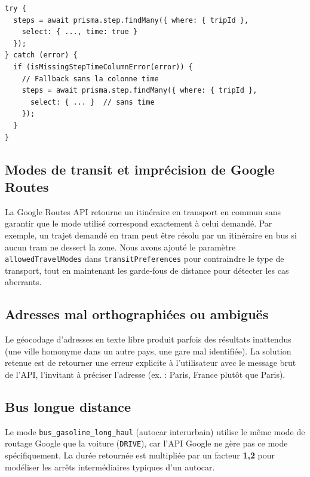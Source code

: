 \documentclass[11pt,a4paper]{article}
\begin{document}
\begin{lstlisting}[caption={Détection et contournement de la colonne manquante}]
try {
  steps = await prisma.step.findMany({ where: { tripId },
    select: { ..., time: true }
  });
} catch (error) {
  if (isMissingStepTimeColumnError(error)) {
    // Fallback sans la colonne time
    steps = await prisma.step.findMany({ where: { tripId },
      select: { ... }  // sans time
    });
  }
}
\end{lstlisting}

\subsection{Modes de transit et imprécision de Google Routes}

La Google Routes API retourne un itinéraire en transport en commun sans garantir que le mode utilisé correspond exactement à celui demandé. Par exemple, un trajet demandé en \og tram \fg{} peut être résolu par un itinéraire en bus si aucun tram ne dessert la zone. Nous avons ajouté le paramètre \texttt{allowedTravelModes} dans \texttt{transitPreferences} pour contraindre le type de transport, tout en maintenant les garde-fous de distance pour détecter les cas aberrants.

\subsection{Adresses mal orthographiées ou ambiguës}

Le géocodage d'adresses en texte libre produit parfois des résultats inattendus (une ville homonyme dans un autre pays, une gare mal identifiée). La solution retenue est de retourner une erreur explicite à l'utilisateur avec le message brut de l'API, l'invitant à préciser l'adresse (ex. : \og Paris, France\fg{} plutôt que \og Paris\fg{}).

\subsection{Bus longue distance}

Le mode \texttt{bus\_gasoline\_long\_haul} (autocar interurbain) utilise le même mode de routage Google que la voiture (\texttt{DRIVE}), car l'API Google ne gère pas ce mode spécifiquement. La durée retournée est multipliée par un facteur \textbf{1,2} pour modéliser les arrêts intermédiaires typiques d'un autocar.

\newpage
\end{document}
